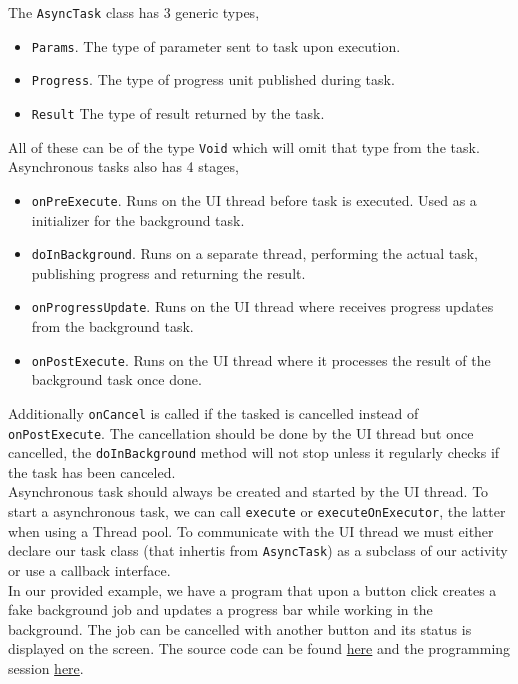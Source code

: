 The \texttt{AsyncTask} class has 3 generic types,
\begin{itemize}
\item \texttt{Params}. The type of parameter sent to task upon execution.
\item \texttt{Progress}. The type of progress unit published during task.
\item \texttt{Result} The type of result returned by the task.
\end{itemize}
All of these can be of the type \texttt{Void} which will omit that type from the task. Asynchronous tasks also has 4 stages,
\begin{itemize}
\item \texttt{onPreExecute}. Runs on the UI thread before task is executed. Used as a initializer for the background task.
\item \texttt{doInBackground}. Runs on a separate thread, performing the actual task, publishing progress and returning the result.
\item \texttt{onProgressUpdate}. Runs on the UI thread where receives progress updates from the background task.
\item \texttt{onPostExecute}. Runs on the UI thread where it processes the result of the background task once done.
\end{itemize}
Additionally \texttt{onCancel} is called if the tasked is cancelled instead of \texttt{onPostExecute}. The cancellation should be done by the UI thread but once cancelled, the \texttt{doInBackground} method will not stop unless it regularly checks if the task has been canceled.\\

Asynchronous task should always be created and started by the UI thread. To start a asynchronous task, we can call \texttt{execute} or \texttt{executeOnExecutor}, the latter when using a Thread pool. To communicate with the UI thread we must either declare our task class (that inhertis from \texttt{AsyncTask}) as a subclass of our activity or use a callback interface.\\

In our provided example, we have a program that upon a button click creates a fake background job and updates a progress bar while working in the background. The job can be cancelled with another button and its status is displayed on the screen. The source code can be found \href{https://github.com/JonSteinn/AndroidDevelopment/tree/master/examples/lab2/asynctask}{here} and the programming session \href{TODO}{here}.

